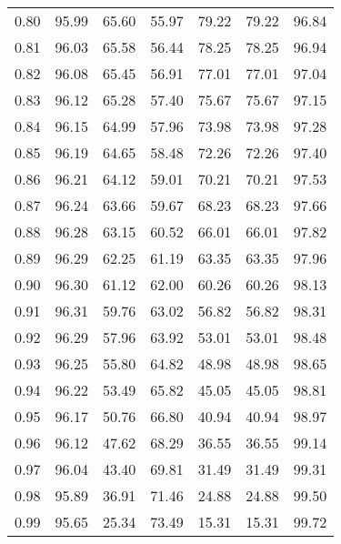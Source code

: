 \begin{tabular}{|c|c|c|c|c|c|c|}
      0.80 &     95.99 &     65.60 &      55.97 &   79.22 &      79.22 &         96.84 \\
      0.81 &     96.03 &     65.58 &      56.44 &   78.25 &      78.25 &         96.94 \\
      0.82 &     96.08 &     65.45 &      56.91 &   77.01 &      77.01 &         97.04 \\
      0.83 &     96.12 &     65.28 &      57.40 &   75.67 &      75.67 &         97.15 \\
      0.84 &     96.15 &     64.99 &      57.96 &   73.98 &      73.98 &         97.28 \\
      0.85 &     96.19 &     64.65 &      58.48 &   72.26 &      72.26 &         97.40 \\
      0.86 &     96.21 &     64.12 &      59.01 &   70.21 &      70.21 &         97.53 \\
      0.87 &     96.24 &     63.66 &      59.67 &   68.23 &      68.23 &         97.66 \\
      0.88 &     96.28 &     63.15 &      60.52 &   66.01 &      66.01 &         97.82 \\
      0.89 &     96.29 &     62.25 &      61.19 &   63.35 &      63.35 &         97.96 \\
      0.90 &     96.30 &     61.12 &      62.00 &   60.26 &      60.26 &         98.13 \\
      0.91 &     96.31 &     59.76 &      63.02 &   56.82 &      56.82 &         98.31 \\
      0.92 &     96.29 &     57.96 &      63.92 &   53.01 &      53.01 &         98.48 \\
      0.93 &     96.25 &     55.80 &      64.82 &   48.98 &      48.98 &         98.65 \\
      0.94 &     96.22 &     53.49 &      65.82 &   45.05 &      45.05 &         98.81 \\
      0.95 &     96.17 &     50.76 &      66.80 &   40.94 &      40.94 &         98.97 \\
      0.96 &     96.12 &     47.62 &      68.29 &   36.55 &      36.55 &         99.14 \\
      0.97 &     96.04 &     43.40 &      69.81 &   31.49 &      31.49 &         99.31 \\
      0.98 &     95.89 &     36.91 &      71.46 &   24.88 &      24.88 &         99.50 \\
      0.99 &     95.65 &     25.34 &      73.49 &   15.31 &      15.31 &         99.72 \\
\bottomrule
\end{tabular}
